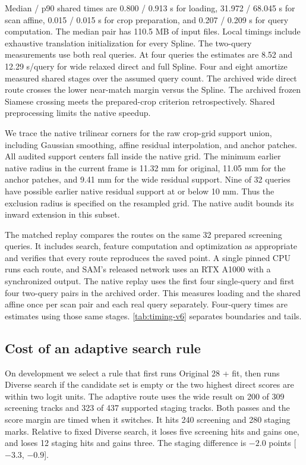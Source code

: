 Median / p90 shared times are 0.800 / 0.913 s for loading, 31.972 / 68.045 s for scan affine, 0.015 / 0.015 s for crop preparation, and 0.207 / 0.209 s for query computation. The median pair has 110.5 MB of input files. Local timings include exhaustive translation initialization for every Spline. The two-query measurements use both real queries. At four queries the estimates are 8.52 and 12.29 s/query for wide relaxed direct and full Spline. Four and eight amortize measured shared stages over the assumed query count. The archived wide direct route crosses the lower near-match margin versus the Spline. The archived frozen Siamese crossing meets the prepared-crop criterion retrospectively. Shared preprocessing limits the native speedup.

We trace the native trilinear corners for the raw crop-grid support union, including Gaussian smoothing, affine residual interpolation, and anchor patches. All audited support centers fall inside the native grid. The minimum earlier native radius in the current frame is 11.32 mm for original, 11.05 mm for the anchor patches, and 9.41 mm for the wide residual support. Nine of 32 queries have possible earlier native residual support at or below 10 mm. Thus the exclusion radius is specified on the resampled grid. The native audit bounds its inward extension in this subset.

The matched replay compares the routes on the same 32 prepared screening queries. It includes search, feature computation and optimization as appropriate and verifies that every route reproduces the saved point. A single pinned CPU runs each route, and SAM's released network uses an RTX A1000 with a synchronized output. The native replay uses the first four single-query and first four two-query pairs in the archived order. This measures loading and the shared affine once per scan pair and each real query separately. Four-query times are estimates using those same stages. \cref{tab:timing-v6} separates boundaries and tails.

\subsection{Cost of an adaptive search rule}
On development we select a rule that first runs Original 28 + fit, then runs Diverse search if the candidate set is empty or the two highest direct scores are within two logit units. The adaptive route uses the wide result on 200 of 309 screening tracks and 323 of 437 supported staging tracks. Both passes and the score margin are timed when it switches. It hits 240 screening and 280 staging marks. Relative to fixed Diverse search, it loses five screening hits and gains one, and loses 12 staging hits and gains three. The staging difference is $-2.0$ points [$-3.3$, $-0.9$].

